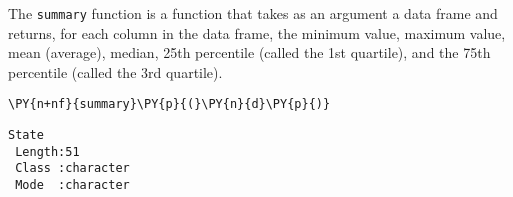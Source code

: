     The \texttt{summary} function is a function that takes as an argument a
data frame and returns, for each column in the data frame, the minimum
value, maximum value, mean (average), median, 25th percentile (called
the 1st quartile), and the 75th percentile (called the 3rd quartile).

    \begin{tcolorbox}[breakable, size=fbox, boxrule=1pt, pad at break*=1mm,colback=cellbackground, colframe=cellborder]
\begin{Verbatim}[commandchars=\\\{\}]
\PY{n+nf}{summary}\PY{p}{(}\PY{n}{d}\PY{p}{)}
\end{Verbatim}
\end{tcolorbox}

    
    \begin{Verbatim}[commandchars=\\\{\}]
    State          
 Length:51         
 Class :character  
 Mode  :character  
                   
                   
                   

\end{Verbatim}
